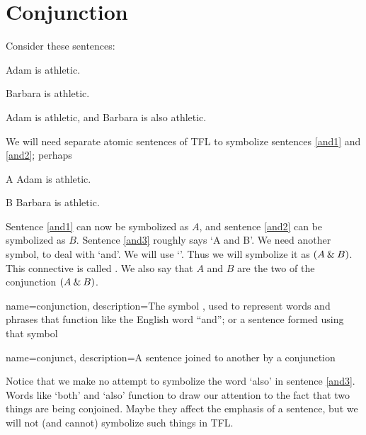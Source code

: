 \section{Conjunction}
\label{s:ConnectiveConjunction}

Consider these sentences:
	\begin{earg}
		\item[\ex{and1}]Adam is athletic.
		\item[\ex{and2}]Barbara is athletic.
		\item[\ex{and3}]Adam is athletic, and Barbara is also athletic.
	\end{earg}
We will need separate atomic sentences of TFL to symbolize sentences \ref{and1} and \ref{and2}; perhaps
	\begin{ekey}
		\item[A] Adam is athletic.
		\item[B] Barbara is athletic.
	\end{ekey}
Sentence \ref{and1} can now be symbolized as $A$, and sentence \ref{and2} can be symbolized as $B$. Sentence \ref{and3} roughly says `A and B'. We need another symbol, to deal with `and'. We will use `\eand'. Thus we will symbolize it as $(A\mathbin{\&} B)$. This connective is called . We also say that $A$ and $B$ are the two  of the conjunction $(A \mathbin{\&} B)$.

	
	
{
name=conjunction,
description={The symbol \eand, used to represent words and phrases that function like the English word ``and''; or a sentence formed using that symbol}
}

{
name=conjunct,
description={A sentence joined to another by a \gls{conjunction}}
}


Notice that we make no attempt to symbolize the word `also' in sentence \ref{and3}. Words like `both' and `also' function to draw our attention to the fact that two things are being conjoined. Maybe they affect the emphasis of a sentence, but we will not (and cannot) symbolize such things in TFL.

